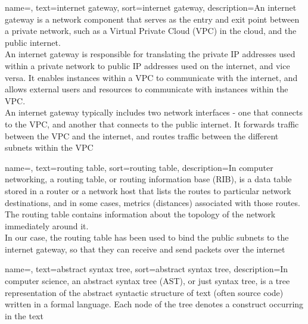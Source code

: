 {
    name=,
    text=internet gateway,
    sort=internet gateway,
    description={An internet gateway is a network component that serves as the entry and exit point between a private network, such as a Virtual Private Cloud (VPC) in the cloud, and the public internet.\\
    An internet gateway is responsible for translating the private IP addresses used within a private network to public IP addresses used on the internet, and vice versa. It enables instances within a VPC to communicate with the internet, and allows external users and resources to communicate with instances within the VPC.\\    
    An internet gateway typically includes two network interfaces - one that connects to the VPC, and another that connects to the public internet. It forwards traffic between the VPC and the internet, and routes traffic between the different subnets within the VPC}
}

{
    name=,
    text=routing table,
    sort=routing table,
    description={In computer networking, a routing table, or routing information base (RIB), is a data table stored in a router or a network host that lists the routes to particular network destinations, and in some cases, metrics (distances) associated with those routes. The routing table contains information about the topology of the network immediately around it.\\
    In our case, the routing table has been used to bind the public subnets to the internet gateway, so that they can receive and send packets over the internet}
}

{
    name=,
    text=abstract syntax tree,
    sort=abstract syntax tree,
    description={In computer science, an abstract syntax tree (AST), or just syntax tree, is a tree representation of the abstract syntactic structure of text (often source code) written in a formal language. Each node of the tree denotes a construct occurring in the text}
}